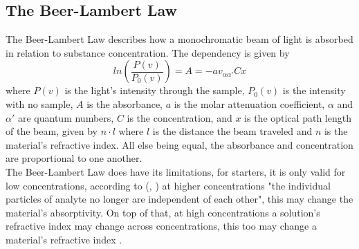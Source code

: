 \documentclass[reprint,amsmath,amssymb,aps, prl]{revtex4-2}
\begin{document}
\subsection{The Beer-Lambert Law}
The Beer-Lambert Law describes how a monochromatic beam of light is absorbed in relation to substance concentration. The dependency is given by
\begin{equation} \label{eq:BeerLambert}
ln\left(\frac{P(v)}{P_{0}(v)}\right)=A=-av_{\alpha\alpha'}Cx
\end{equation}
where $P(v)$ is the light's intensity through the sample, $P_{0}(v)$ is the intensity with no sample, $A$ is the absorbance, $a$ is the molar attenuation coefficient, $\alpha$ and $\alpha'$ are quantum numbers, $C$ is the concentration, and $x$ is the optical path length of the beam, given by $n\cdot l$ where $l$ is the distance the beam traveled and $n$ is the material's refractive index. All else being equal, the absorbance and concentration are proportional to one another. \\
The Beer-Lambert Law does have its limitations, for starters, it is only valid for low concentrations, according to (, \cite{2020Beer}) at higher concentrations "the individual particles of analyte no longer are independent of each other", this may change the material's absorptivity. On top of that, at high concentrations a solution's refractive index may change across concentrations, this too may change a material's refractive index \cite{2020Beer}.
\end{document}
